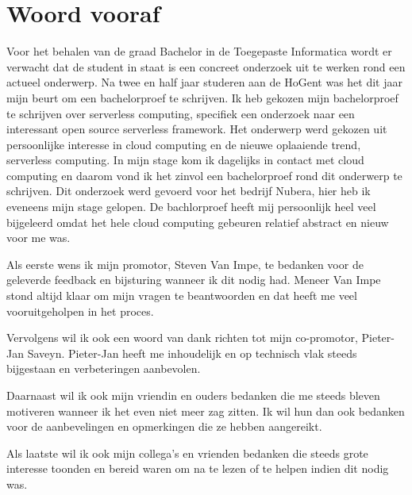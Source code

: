 
\chapter*{Woord vooraf}
\label{ch:voorwoord}

Voor het behalen van de graad Bachelor in de Toegepaste Informatica wordt er verwacht dat de student in staat is een concreet onderzoek uit te werken rond een actueel onderwerp. Na twee en half jaar studeren aan de HoGent was het dit jaar mijn beurt om een bachelorproef te schrijven. Ik heb gekozen mijn bachelorproef te schrijven over serverless computing, specifiek een onderzoek naar een interessant open source serverless framework. Het onderwerp werd gekozen uit persoonlijke interesse in cloud computing en de nieuwe oplaaiende trend, serverless computing. In mijn stage kom ik dagelijks in contact met cloud computing en daarom vond ik het zinvol een bachelorproef rond dit onderwerp te schrijven. Dit onderzoek werd gevoerd voor het bedrijf Nubera, hier heb ik eveneens mijn stage gelopen. De bachlorproef heeft mij persoonlijk heel veel bijgeleerd omdat het hele cloud computing gebeuren relatief abstract en nieuw voor me was. 

Als eerste wens ik mijn promotor, Steven Van Impe, te bedanken voor de geleverde feedback en bijsturing wanneer ik dit nodig had. Meneer Van Impe stond altijd klaar om mijn vragen te beantwoorden en dat heeft me veel vooruitgeholpen in het proces.

Vervolgens wil ik ook een woord van dank richten tot mijn co-promotor, Pieter-Jan Saveyn. Pieter-Jan heeft me inhoudelijk en op technisch vlak steeds bijgestaan en verbeteringen aanbevolen.

Daarnaast wil ik ook mijn vriendin en ouders bedanken die me steeds bleven motiveren wanneer ik het even niet meer zag zitten. Ik wil hun dan ook bedanken voor de aanbevelingen en opmerkingen die ze hebben aangereikt.

Als laatste wil ik ook mijn collega's en vrienden bedanken die steeds grote interesse toonden en bereid waren om na te lezen of te helpen indien dit nodig was.
